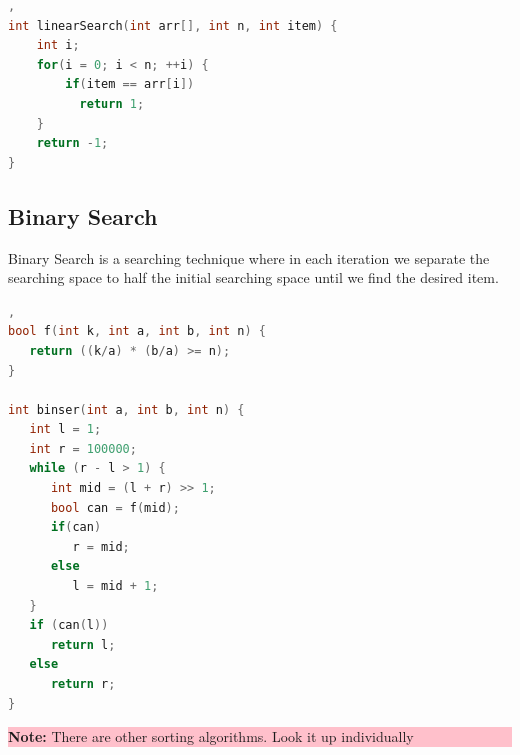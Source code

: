 \begin{lstlisting}[language=c,caption=Linear Search Implementation], 
int linearSearch(int arr[], int n, int item) {
    int i;
    for(i = 0; i < n; ++i) {
        if(item == arr[i])
          return 1;
    }
    return -1;
}
\end{lstlisting}

\subsection{Binary Search}
Binary Search is a searching technique where in each iteration we separate the searching space to half the initial searching space
until we find the desired item.

\begin{lstlisting}[language=c,caption=Binary Search Implementation],   
bool f(int k, int a, int b, int n) {
   return ((k/a) * (b/a) >= n);
}

int binser(int a, int b, int n) {
   int l = 1;
   int r = 100000;
   while (r - l > 1) {
      int mid = (l + r) >> 1;
      bool can = f(mid);
      if(can)
         r = mid;
      else
         l = mid + 1;
   }
   if (can(l))
      return l;
   else
      return r;
}
\end{lstlisting}

\begin{center}
    \colorbox{pink}{\parbox{0.8\linewidth}{\textbf{Note:} There are other sorting algorithms. Look it up individually}}
\end{center}

